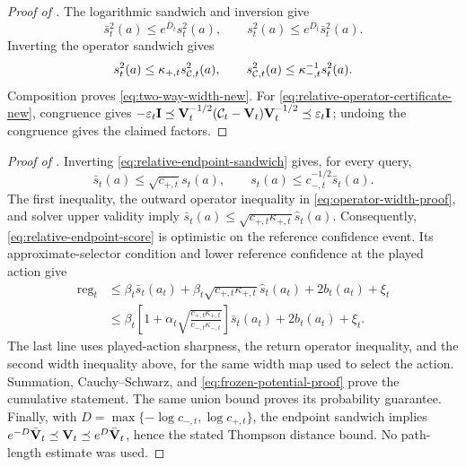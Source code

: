 \begin{proof}[Proof of ]
The logarithmic sandwich and inversion give
\[
 \bar s_t^2(a)\le e^{\bar D_t}s_t^2(a),\qquad
 s_t^2(a)\le e^{\bar D_t}\bar s_t^2(a).
\]
Inverting the operator sandwich gives
\[
 s_t^2(a)\le\kappa_{+,t}s_{\mathcal{C},t}^2(a),\qquad
 s_{\mathcal{C},t}^2(a)\le\kappa_{-,t}^{-1}s_t^2(a).
\]
Composition proves \eqref{eq:two-way-width-new}.  For
\eqref{eq:relative-operator-certificate-new}, congruence gives
$-\varepsilon_t\mathbf{I}\preceq
\mathbf{V}_t^{-1/2}(\mathcal{C}_t-\mathbf{V}_t)\mathbf{V}_t^{-1/2}
\preceq\varepsilon_t\mathbf{I}$; undoing the congruence gives the claimed factors.
\end{proof}

\begin{proof}[Proof of ]
Inverting \eqref{eq:relative-endpoint-sandwich} gives, for every query,
\[
 \bar s_t(a)\le\sqrt{c_{+,t}}s_t(a),\qquad
 s_t(a)\le c_{-,t}^{-1/2}\bar s_t(a).
\]
The first inequality, the outward operator inequality in
\eqref{eq:operator-width-proof}, and solver upper validity imply
$\bar s_t(a)\le\sqrt{c_{+,t}\kappa_{+,t}}\hat s_t(a)$.
Consequently, \eqref{eq:relative-endpoint-score} is optimistic on the reference
confidence event.  Its approximate-selector condition and lower reference
confidence at the played action give
\begin{align*}
 \operatorname{reg}_t
 &\le\beta_t\bar s_t(a_t)
 +\beta_t\sqrt{c_{+,t}\kappa_{+,t}}\hat s_t(a_t)
 +2b_t(a_t)+\xi_t\\
 &\le\beta_t\left[1+\alpha_t
 \sqrt{\frac{c_{+,t}\kappa_{+,t}}{c_{-,t}\kappa_{-,t}}}\right]
 \bar s_t(a_t)+2b_t(a_t)+\xi_t.
\end{align*}
The last line uses played-action sharpness, the return operator inequality,
and the second width inequality above, for the same width map used to select
the action.  Summation, Cauchy--Schwarz, and
\eqref{eq:frozen-potential-proof} prove the cumulative statement.  The same
union bound proves its probability guarantee.  Finally, with
$D=\max\{-\log c_{-,t},\log c_{+,t}\}$, the endpoint sandwich implies
$e^{-D}\bar{\mathbf{V}}_t\preceq\mathbf{V}_t\preceq e^D\bar{\mathbf{V}}_t$, hence the stated Thompson
distance bound.  No path-length estimate was used.
\end{proof}

